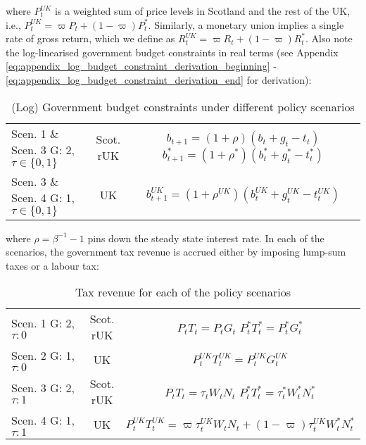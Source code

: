 where $P^{UK}_t$ is a weighted sum of price levels in Scotland and the rest of the UK, i.e., $P^{UK}_t = \varpi P_t + (1-\varpi)P^*_t$. Similarly, a monetary union implies a single rate of gross return, which we define as $R^{UK}_t = \varpi R_t + (1-\varpi)R^*_t$. Also note the log-linearised government budget constraints in real terms (see Appendix \ref{eq:appendix_log_budget_constraint_derivation_beginning} - \ref{eq:appendix_log_budget_constraint_derivation_end} for derivation):
\begin{table}[H]
    \renewcommand{\arraystretch}{2}
    \centering
    \begin{tabular}{l|c|c}
    \makecell{Scen. 1 \& Scen. 3\\ G: 2, $\tau \in \{0, 1\}$} & \makecell{Scot. \\ rUK } & 
        \makecell{
            $b_{t+1} = (1 + \rho)(b_t + g_t - t_t)$\\
            $b^*_{t+1} = (1 + \rho^*)(b^*_t + g^*_t - t^*_t)$
        }  \\ 
    \makecell{Scen. 3 \& Scen. 4\\ G: 1, $\tau \in \{0, 1\}$} & UK & 
    $b^{UK}_{t+1} = (1 + \rho^{UK})(b^{UK}_t + g^{UK}_t - t^{UK}_t)$
    \end{tabular}
    \vspace{0.5cm}
    \caption{(Log) Government budget constraints under different policy scenarios}
\end{table}
where $\rho = \beta^{-1} - 1$ pins down the steady state interest rate. In each of the scenarios, the government tax revenue is accrued either by imposing lump-sum taxes or a labour tax:
\begin{table}[H]
    \renewcommand{\arraystretch}{2}
    \centering
    \begin{tabular}{l|c|c}
    \makecell{Scen. 1 \\ G: 2, $\tau: 0$} & \makecell{Scot. \\ rUK } & 
        \makecell{
            $P_t T_t = P_tG_t$\\
            $ P^*_tT^*_t = P^*_tG^*_t $
        }  \\ 
    \makecell{Scen. 2 \\ G: 1, $\tau: 0$} & UK & 
    $P^{UK}_tT^{UK}_t = P^{UK}_tG^{UK}_t$\\
    \makecell{Scen. 3 \\ G: 2, $\tau: 1$} & \makecell{Scot. \\ rUK } & 
    \makecell{
        $P_tT_t = \tau_tW_t N_t$\\ 
        $P^*_tT^*_t = \tau^*_tW^*_t N^*_t$
    }  \\
    \makecell{Scen. 4 \\ G: 1, $\tau: 1$} & UK & 
    $P^{UK}_tT^{UK}_t = \varpi\tau^{UK}_tW_t N_t + (1-\varpi)\tau^{UK}_tW^*_t N^*_t$
    \end{tabular}
    \caption{Tax revenue for each of the policy scenarios}
\end{table}
